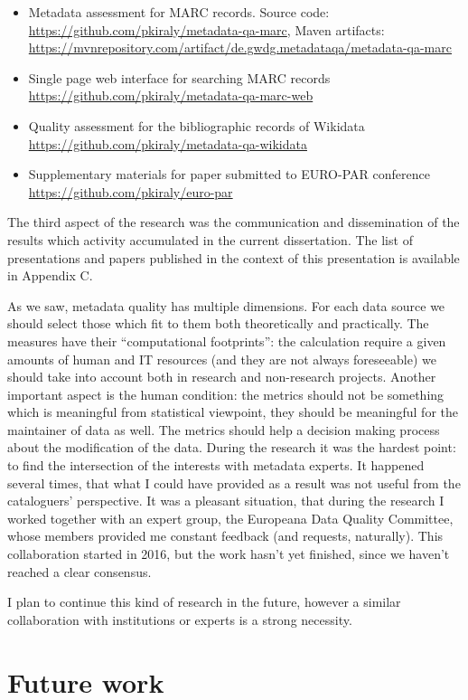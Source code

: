 \begin{itemize}
\item Metadata assessment for MARC records. Source code: \url{https://github.com/pkiraly/metadata-qa-marc}, Maven artifacts: \url{https://mvnrepository.com/artifact/de.gwdg.metadataqa/metadata-qa-marc} 
\item Single page web interface for searching MARC records \url{https://github.com/pkiraly/metadata-qa-marc-web}
\item Quality assessment for the bibliographic records of Wikidata \url{https://github.com/pkiraly/metadata-qa-wikidata}
\item Supplementary materials for paper submitted to EURO-PAR conference \url{https://github.com/pkiraly/euro-par}
\end{itemize}

The third aspect of the research was the communication and  dissemination of the results which activity accumulated in the current dissertation. The list of presentations and papers published in the context of this presentation is available in Appendix C.

As we saw, metadata quality has multiple dimensions. For each data source we should select those which fit to them both theoretically and practically. The measures have their ``computational footprints'': the calculation require a given amounts of human and IT resources (and they are not always foreseeable) we should take into account both in research and non-research projects. Another important aspect is the human condition: the metrics should not be something which is meaningful from statistical viewpoint, they should be meaningful for the maintainer of data as well. The metrics should help a decision making process about the modification of the data. During the research it was the hardest point: to find the intersection of the interests with metadata experts. It happened several times, that what I could have provided as a result was not useful from the cataloguers' perspective. It was a pleasant situation, that during the research I worked together with an expert group, the Europeana Data Quality Committee, whose members provided me constant feedback (and requests, naturally). This collaboration started in 2016, but the work hasn't yet finished, since we haven't reached a clear consensus.

I plan to continue this kind of research in the future, however a similar collaboration with institutions or experts is a strong necessity.

\section{Future work}

